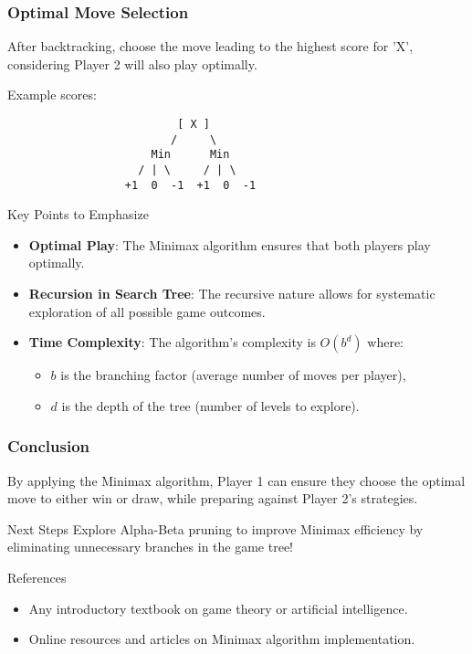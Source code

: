\documentclass[aspectratio=169]{beamer}
\begin{document}
\begin{frame}[fragile]
    \frametitle{Optimal Move Selection}
    After backtracking, choose the move leading to the highest score for 'X', considering Player 2 will also play optimally.

    Example scores:
    \begin{verbatim}
                          [ X ]
                         /     \
                      Min      Min
                    / | \     / | \
                  +1  0  -1  +1  0  -1
    \end{verbatim}

    \begin{block}{Key Points to Emphasize}
        \begin{itemize}
            \item \textbf{Optimal Play}: The Minimax algorithm ensures that both players play optimally.
            \item \textbf{Recursion in Search Tree}: The recursive nature allows for systematic exploration of all possible game outcomes.
            \item \textbf{Time Complexity}: The algorithm's complexity is \(O(b^d)\) where:
            \begin{itemize}
                \item \(b\) is the branching factor (average number of moves per player),
                \item \(d\) is the depth of the tree (number of levels to explore).
            \end{itemize}
        \end{itemize}
    \end{block}
\end{frame}

\begin{frame}[fragile]
    \frametitle{Conclusion}
    By applying the Minimax algorithm, Player 1 can ensure they choose the optimal move to either win or draw, while preparing against Player 2's strategies.

    \begin{block}{Next Steps}
        Explore Alpha-Beta pruning to improve Minimax efficiency by eliminating unnecessary branches in the game tree!
    \end{block}

    \begin{block}{References}
        \begin{itemize}
            \item Any introductory textbook on game theory or artificial intelligence.
            \item Online resources and articles on Minimax algorithm implementation.
        \end{itemize}
    \end{block}
\end{frame}
\end{document}
